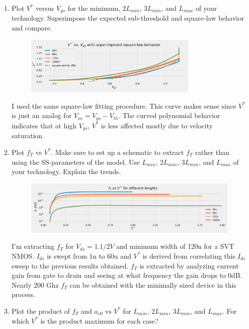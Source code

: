 \begin{enumerate}
\item {\color{blue}Plot $V^*$ versus $V_{gs}$ for the minimum, $2 L_{min}$, $3 L_{min}$, and $L_{max}$ of your technology. Superimpose the expected sub-threshold and square-law behavior and compare.}

    \begin{figure}[H]
        \centering
        \includegraphics[width=0.8\textwidth]{figs/problem9.png}
    \end{figure}

    I used the same square-law fitting procedure. This curve makes sense since $V^*$ is just an analog for $V_{ov} = V_{gs} - V_{th}$. The curved polynomial behavior indicates that at high $V_{gs}$, $V^*$ is less affected mostly due to velocity saturation.

\item {\color{blue}Plot $f_T$ vs $V^*$. Make sure to set up a schematic to extract $f_T$ rather than using the SS-parameters of the model. Use $L_{min}$, $2 L_{min}$, $3 L_{min}$, and $L_{max}$ of your technology. Explain the trends.}

    \begin{figure}[H]
        \centering
        \includegraphics[width=\textwidth]{figs/problem10.png}
    \end{figure}

    I'm extracting $f_T$ for $V_{ds} = 1.1/2 V$ and minimum width of 120n for a SVT NMOS. $I_{ds}$ is swept from 1n to 60u and $V^*$ is derived from correlating this $I_{ds}$ sweep to the previous results obtained. $f_T$ is extracted by analyzing current gain from gate to drain and seeing at what frequency the gain drops to 0dB. Nearly 200 Ghz $f_T$ can be obtained with the minimally sized device in this process.

\item {\color{blue}Plot the product of $f_T$ and $a_{v0}$ vs $V^*$ for $L_{min}$, $2 L_{min}$, $3 L_{min}$, and $L_{max}$. For which $V^*$ is the product maximum for each case?}


\end{enumerate}
